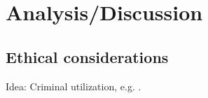 \chapter{Analysis/Discussion}

\section{Ethical considerations}

Idea: Criminal utilization, e.g. \cite{alghawi-simbox}.
